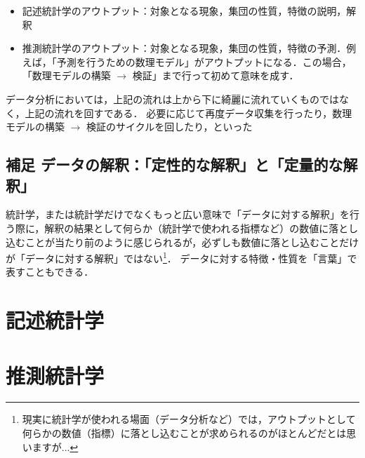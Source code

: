 \vspace{10pt}

\vspace{10pt}

\begin{itemize}
  \item 記述統計学のアウトプット：対象となる現象，集団の性質，特徴の説明，解釈
  \item 推測統計学のアウトプット：対象となる現象，集団の性質，特徴の予測．例えば，「予測を行うための数理モデル」がアウトプットになる．この場合，「数理モデルの構築 $\rightarrow$ 検証」まで行って初めて意味を成す．
\end{itemize}


データ分析においては，上記の流れは上から下に綺麗に流れていくものではなく，上記の流れを回すである．
必要に応じて再度データ収集を行ったり，数理モデルの構築 $\rightarrow$ 検証のサイクルを回したり，といった


\section{補足 データの解釈：「定性的な解釈」と「定量的な解釈」}

統計学，または統計学だけでなくもっと広い意味で「データに対する解釈」を行う際に，解釈の結果として何らか（統計学で使われる指標など）の数値に落とし込むことが当たり前のように感じられるが，必ずしも数値に落とし込むことだけが「データに対する解釈」ではない\footnote{現実に統計学が使われる場面（データ分析など）では，アウトプットとして何らかの数値（指標）に落とし込むことが求められるのがほとんどだとは思いますが...}．
データに対する特徴・性質を「言葉」で表すこともできる．

\chapter{記述統計学} %
\label{cha:記述統計学}


\chapter{推測統計学} %
\label{cha:推測統計学}

